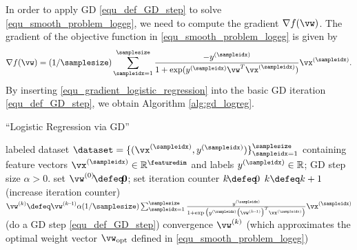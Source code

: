 \documentclass[12pt]{report}
\begin{document}
In order to apply GD \eqref{equ_def_GD_step} to solve \eqref{equ_smooth_problem_logeg}, 
we need to compute the gradient $\nabla f(\vw)$. 
The gradient of the objective function in \eqref{equ_smooth_problem_logeg} is given by 
\begin{equation}
\label{equ_gradient_logistic_regression}
\nabla f(\vw) = (1/\samplesize) \sum_{\sampleidx=1}^{\samplesize} \frac{-y^{(\sampleidx)}}{1 + \exp ( y^{(\sampleidx)} \vw^{T} \vx^{(\sampleidx)})} \vx^{(\sampleidx)}.
\end{equation} 
By inserting \eqref{equ_gradient_logistic_regression} into the basic GD iteration \eqref{equ_def_GD_step}, we obtain Algorithm \ref{alg:gd_logreg}. 
\begin{algorithm}[htbp]
\caption{``Logistic Regression via GD''}\label{alg:gd_logreg}
\begin{algorithmic}[1]
\renewcommand{\algorithmicrequire}{\textbf{Input:}}
\renewcommand{\algorithmicensure}{\textbf{Output:}}
\Require   labeled dataset $\dataset=\{ (\vx^{(\sampleidx)}, y^{(\sampleidx)}) \}_{\sampleidx=1}^{\samplesize}$ containing feature vectors 
$\vx^{(\sampleidx)} \in \mathbb{R}^{\featuredim}$ and labels $y^{(\sampleidx)} \in \mathbb{R}$; GD step size $\alpha >0$. 
\Statex\hspace{-6mm}{\bf Initialize:}set $\vw^{(0)}\!\defeq\!\mathbf{0}$; set iteration counter $k\!\defeq\!0$   
\Repeat 
\State $k \defeq k +1$    (increase iteration counter) 
\State  $\vw^{(k)} \defeq \vw^{(k\!-\!1)}  \alpha (1/\samplesize) \sum_{\sampleidx=1}^{\samplesize} \frac{y^{(\sampleidx)}}{1 + \exp \big( y^{(\sampleidx)} \big(\vw^{(k\!-\!1)}\big)^{T} \vx^{(\sampleidx)}\big)} \vx^{(\sampleidx)}$  (do a GD step \eqref{equ_def_GD_step})
\Until convergence 
\Ensure $\vw^{(k)}$ (which approximates the optimal weight vector $\vw_{\rm opt}$ defined in \eqref{equ_smooth_problem_logeg})
\end{algorithmic}
\end{algorithm}
\end{document}
